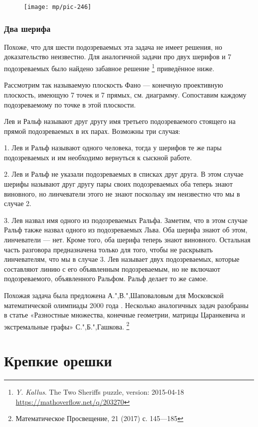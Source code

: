 \documentclass[twoside]{book}
\begin{document}
\begin{figure}
\vskip-4mm
\centering
\texttt{[image: mp/pic-246]}
\end{figure}

\subsubsection*{Два шерифа}
Похоже, что для шести подозреваемых эта задача не имеет решения, но доказательство неизвестно.
Для аналогичной задачи про двух шерифов и 7 подозреваемых было найдено забавное решение%
\footnote{\emph{Y. Kallus}. The Two Sheriffs puzzle, version: 2015-04-18 \url{https://mathoverflow.net/q/203270}}
приведённое ниже.

Рассмотрим так называемую плоскость Фано --- конечную проективную плоскость, имеющую 7 точек и 7 прямых, см. диаграмму.
Сопоставим каждому подозреваемому по точке в этой плоскости.

Лев и Ральф называют друг другу имя третьего подозреваемого стоящего на прямой подозреваемых в их парах.
Возможны три случая:

1. Лев и Ральф называют одного человека, тогда у шерифов те же пары подозреваемых и им необходимо вернуться к сыскной работе.

2. Лев и Ральф не указали подозреваемых в списках друг друга.
В этом случае шерифы называют друг другу пары своих подозреваемых оба теперь знают виновного, но линчеватели этого не знают поскольку им неизвестно что мы в случае 2.

3. Лев назвал имя одного из подозреваемых Ральфа.
Заметим, что в этом случае Ральф также назвал одного из подозреваемых Льва.
Оба шерифа знают об этом, линчеватели --- нет.
Кроме того, оба шерифа теперь знают виновного.
Остальная часть разговора предназначена только для того, чтобы не раскрывать линчевателям, что мы в случае 3. Лев называет двух подозреваемых, которые составляют линию с его объявленным подозреваемым, но не включают подозреваемого, объявленного Ральфом.
Ральф делает то же самое.

Похожая задача была предложена А.",В.",Шаповаловым для Московской математической олимпиады 2000 года \cite[№ 105089]{problems}.
Несколько аналогичных задач разобраны в статье «Разностные множества, конечные геометрии, матрицы Царанкевича и экстремальные графы» С.",Б.",Гашкова.%
\footnote{Математическое Просвещение, 21 (2017) с. 145---185}

\section{Крепкие орешки}
\end{document}
